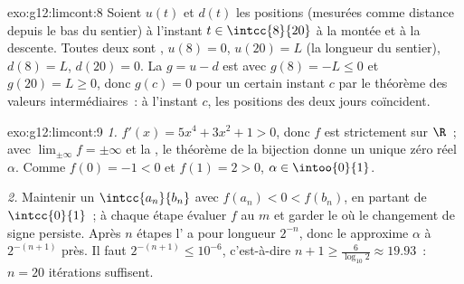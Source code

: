 \begin{solution}{exo:g12:limcont:8}
Soient $u(t)$ et $d(t)$ les positions (mesurées comme distance depuis le
bas du sentier) à l'instant $t \in \intcc{8}{20}$ à la montée et à la
descente. Toutes deux sont , $u(8) = 0$, $u(20) = L$ (la
longueur du sentier), $d(8) = L$, $d(20) = 0$. La  $g = u - d$
est  avec $g(8) = -L \leq 0$ et $g(20) = L \geq 0$, donc
$g(c) = 0$ pour un certain instant $c$ par le théorème des valeurs
intermédiaires~: à l'instant $c$, les positions des deux jours
coïncident.
\end{solution}

\begin{solution}{exo:g12:limcont:9}
\emph{1.} $f'(x) = 5x^4 + 3x^2 + 1 > 0$, donc $f$ est strictement
 sur $\R$~; avec $\lim_{\pm\infty} f = \pm\infty$ et la
, le théorème de la bijection donne un unique zéro réel
$\alpha$. Comme $f(0) = -1 < 0$ et $f(1) = 2 > 0$,
$\alpha \in \intoo{0}{1}$.

\emph{2.} Maintenir un  $\intcc{a_n}{b_n}$ avec
$f(a_n) < 0 < f(b_n)$, en partant de $\intcc{0}{1}$~; à chaque étape
évaluer $f$ au  $m$ et garder le  où le changement
de signe persiste. Après $n$ étapes l' a pour longueur
$2^{-n}$, donc le  approxime $\alpha$ à $2^{-(n+1)}$ près. Il faut
$2^{-(n+1)} \leq 10^{-6}$, c'est-à-dire
$n + 1 \geq \frac{6}{\log_{10} 2} \approx 19.93$~: $n = 20$ itérations
suffisent.
\end{solution}

